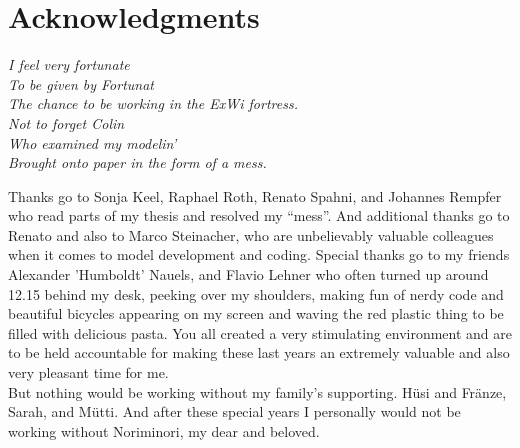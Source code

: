 \chapter*{Acknowledgments}
\begin{center}
{\it
I feel very fortunate\\ 
To be given by Fortunat\\
The chance to be working in the ExWi fortress.\\
\vspace{0.5cm}
Not to forget Colin\\
Who examined my modelin'\\
Brought onto paper in the form of a mess.}\\
\end{center}

Thanks go to Sonja Keel, Raphael Roth, Renato Spahni, and Johannes
Rempfer who read parts of my thesis and resolved my ``mess''. And
additional thanks go to Renato and also to Marco Steinacher, who are
unbelievably valuable colleagues when it comes to model development
and coding. Special thanks go to my friends Alexander 'Humboldt'
Nauels, and Flavio Lehner who often turned up around 12.15 behind my desk,
peeking over my shoulders, making fun of nerdy code and beautiful
bicycles appearing on my screen and waving the red plastic thing to
be filled with delicious pasta. You all created a very stimulating
environment and are to be held accountable for making these last years
an extremely valuable and also very pleasant time for me.\\

But nothing would be working without my family's supporting. H\"usi
and Fr\"anze, Sarah, and M\"utti. And after these special years I
personally would not be working without Noriminori, my dear and beloved.
